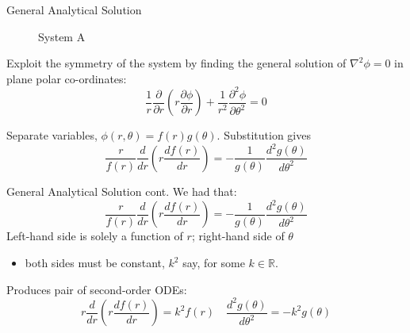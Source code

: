 \documentclass{beamer}
\newcommand{\be}{\begin{equation}}
\newcommand{\ee}{\end{equation}}
\begin{document}
\begin{frame}{General Analytical Solution}
\begin{figure}
\centering
	\caption{System A}
\end{figure}

Exploit the symmetry of the system by finding the general solution of $\nabla^2 \phi=0$
in plane polar co-ordinates: 
%
\be
\frac{1}{r}\frac{\partial}{\partial r}\left(r \frac{\partial \phi}{\partial r}\right) + \frac{1}{r^2}\frac{\partial ^2 \phi}{\partial \theta^2} = 0 
\ee

Separate variables, $\phi(r,\theta)=f(r)g(\theta)$. Substitution gives
%
\be
\frac{r}{f(r)}\frac{d}{dr}\left(r \frac{df(r)}{dr}\right) =- \frac{1}{g(\theta)}\frac{d^2 g(\theta)}{d \theta^2}
\ee

\end{frame}

\begin{frame}{General Analytical Solution cont.}
We had that:
%
\be
\frac{r}{f(r)}\frac{d}{dr}\left(r \frac{df(r)}{dr}\right) =- \frac{1}{g(\theta)}\frac{d^2 g(\theta)}{d \theta^2}
\ee
%
Left-hand side is solely a function of $r$; right-hand side of $\theta$ 
\begin{itemize}
\item both sides must be constant, $k^2$ say, for some $k \in \mathbb{R}$.
\end{itemize}

Produces pair of second-order ODEs:
%
\be
r\frac{d}{dr}\left(r \frac{df(r)}{dr}\right) = k^2 f(r) \quad \frac{d^2 g(\theta)}{d\theta^2} = -k^2 g(\theta)
\ee

\end{frame}
\end{document}
